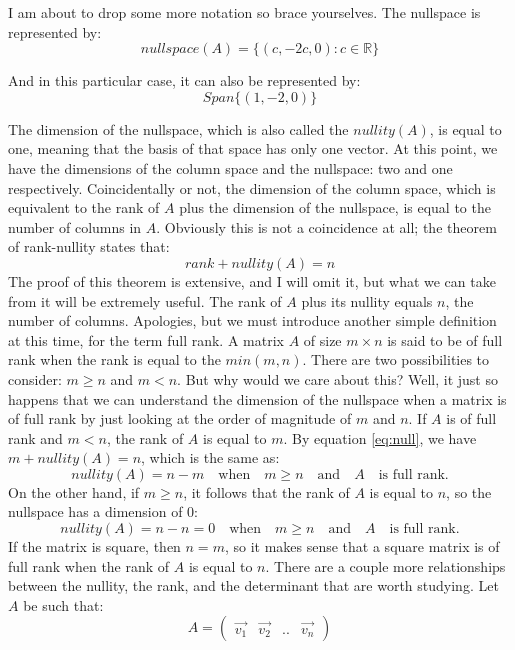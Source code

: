 \documentclass[a4,12pt,twosided,openany]{memoir}
\begin{document}
\par 
\indent
I am about to drop some more notation so brace yourselves. The nullspace is represented by:
\[nullspace(A) =\lbrace (c,-2c, 0) : c \in \mathbb{R} \rbrace\]
\par 
\indent
And in this particular case, it can also be represented by:
\[Span\lbrace (1,-2,0) \rbrace\]
\par 
\indent
The dimension of the nullspace, which is also called the $nullity(A)$, is equal to one, meaning that the basis of that space has only one vector. At this point, we have the dimensions of the column space and the nullspace: two and one respectively. Coincidentally or not, the dimension of the column space, which is equivalent to the rank of $A$ plus the dimension of the nullspace, is equal to the number of columns in $A$. Obviously this is not a coincidence at all; the theorem of rank-nullity states that:
\begin{equation}\label{eq:null}
rank + nullity(A)  = n 
\end{equation}
\indent
The proof of this theorem is extensive, and I will omit it, but what we can take from it will be extremely useful. The rank of $A$ plus its nullity equals $n$, the number of columns. Apologies, but we must introduce another simple definition at this time, for the term full rank. A matrix $A$ of size $m \times n$ is said to be of full rank when the rank is equal to the $min(m,n)$. There are two possibilities to consider: $m \geq n$ and $m < n$. But why would we care about this? Well, it just so happens that we can understand the dimension of the nullspace when a matrix is of full rank by just looking at the order of magnitude of $m$ and $n$. If $A$ is of full rank and $m<n$, the rank of $A$ is equal to $m$. By equation \ref{eq:null}, we have $m+ nullity(A)=n$, which is the same as:
\[nullity(A)  = n - m \quad \textrm{when} \quad    m \geq n  \quad \textrm{and} \quad A \quad \textrm{is full rank.}\]
On the other hand, if $m \geq n$, it follows that the rank of $A$ is equal to $n$, so the nullspace has a dimension of 0:
\[nullity(A)  = n - n = 0 \quad \textrm{when} \quad    m \geq n  \quad \textrm{and} \quad A \quad \textrm{is full rank.}\]
If the matrix is square, then $n = m$, so it makes sense that a square matrix is of full rank when the rank of $A$ is equal to $n$. There are a couple more relationships between the nullity, the rank, and the determinant that are worth studying. Let $A$ be such that:
\[A = \begin{pmatrix}
\overrightarrow{v_1} & \overrightarrow{v_2} & .. & \overrightarrow{v_n}
\end{pmatrix}
\]
\end{document}
